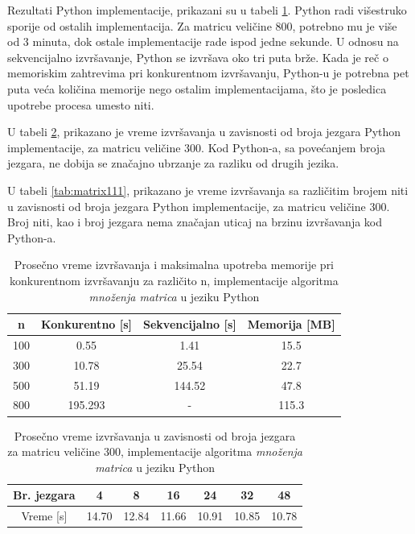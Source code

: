 \documentclass[12pt,oneside]{memoir}
\begin{document}
Rezultati Python implementacije, prikazani su u tabeli \ref{tab:matrix1}. Python radi višestruko sporije od ostalih implementacija. Za matricu veličine 800, potrebno mu je više od 3 minuta, dok ostale implementacije rade ispod jedne sekunde. U odnosu na sekvencijalno izvršavanje, Python se izvršava oko tri puta brže. Kada je reč o memoriskim zahtrevima pri konkurentnom izvršavanju, Python-u je potrebna pet puta veća količina memorije nego ostalim implementacijama, što je posledica upotrebe procesa umesto niti.

U  tabeli \ref{tab:matrix11}, prikazano je vreme izvršavanja u zavisnosti od broja jezgara Python implementacije, za matricu veličine 300. Kod Python-a, sa povećanjem broja jezgara, ne dobija se značajno ubrzanje za razliku od drugih jezika. 

U  tabeli \ref{tab:matrix111}, prikazano je vreme izvršavanja sa različitim brojem niti u zavisnosti od broja jezgara Python implementacije, za matricu veličine 300. Broj niti, kao i broj jezgara  nema značajan uticaj na brzinu izvršavanja kod Python-a.

\begin{table}
\begin{center}
\caption{Prosečno vreme izvršavanja i maksimalna upotreba memorije pri konkurentnom izvršavanju za različito n,  implementacije  algoritma \textit{množenja matrica}  u jeziku Python}
\begin{tabular}{||c||c|c|c||}
\hline
n & Konkurentno [s]& Sekvencijalno [s] & Memorija [MB] \\ \hline
100	&0.55		&1.41		&15.5\\
300	&10.78	&25.54	&22.7\\
500	&51.19	&144.52	&47.8\\
800	&195.293	&- 		&115.3\\
\hline
\end{tabular}
\label{tab:matrix1}
\end{center}
\end{table}

\begin{table}
\begin{center}
\caption{Prosečno vreme izvršavanja u zavisnosti od broja jezgara za matricu veličine 300, implementacije algoritma \textit{množenja matrica} u jeziku Python}
\begin{tabular}{||c||c|c|c|c|c|c||}
\hline
Br. jezgara &4  &8 &16 &24 & 32 &48 \\ \hline
Vreme [s]	&14.70	&12.84	&11.66 	& 10.91	&10.85	&10.78\\ \hline  
\end{tabular}
\label{tab:matrix11}
\end{center}
\end{table}
\end{document}

